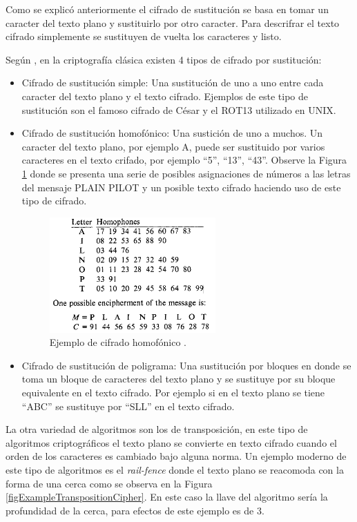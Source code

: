 Como se explicó anteriormente el cifrado de sustitución se basa en tomar un caracter del texto plano y sustituirlo por otro caracter. Para descrifrar el texto cifrado simplemente se sustituyen de vuelta los caracteres y listo.

Según \cite{bruce}, en la criptografía clásica existen 4 tipos de cifrado por sustitución:
\begin{itemize}
\item Cifrado de sustitución simple: Una sustitución de uno a uno entre cada caracter del texto plano y el texto cifrado.
Ejemplos de este tipo de sustitución son el famoso cifrado de César y el ROT13 utilizado en UNIX.

\item Cifrado de sustitución homofónico: Una sustición de uno a muchos. Un caracter del texto plano, por ejemplo A, puede ser sustituido por varios caracteres en el texto crifado, por ejemplo ``5'', ``13'', ``43''. Observe la Figura \ref{figExampleHomophonicCipher} donde se presenta una serie de posibles asignaciones de números a las letras del mensaje PLAIN PILOT y un posible texto cifrado haciendo uso de este tipo de cifrado.

\begin{figure}
	\centering
	\includegraphics[width=0.6\textwidth]{./images/figExampleHomophonicCipher}
	\caption{Ejemplo de cifrado homofónico \citep{denning}.}
	\label{figExampleHomophonicCipher}
\end{figure}


\item Cifrado de sustitución de poligrama: Una sustitución por bloques en donde se toma un bloque de caracteres del texto plano y se sustituye por su bloque equivalente en el texto cifrado. Por ejemplo si en el texto plano se tiene ``ABC'' se sustituye por ``SLL'' en el texto cifrado.
\end{itemize}

La otra variedad de algoritmos son los de transposición, en este tipo de algoritmos criptográficos el texto plano se convierte en texto cifrado cuando el orden de los caracteres es cambiado bajo alguna norma. Un ejemplo moderno de este tipo de algoritmos es el \textit{rail-fence} donde el texto plano se reacomoda con la forma de una cerca como se observa en la Figura \ref{figExampleTranspositionCipher}. En este caso la llave del algoritmo sería la profundidad de la cerca, para efectos de este ejemplo es de 3.


